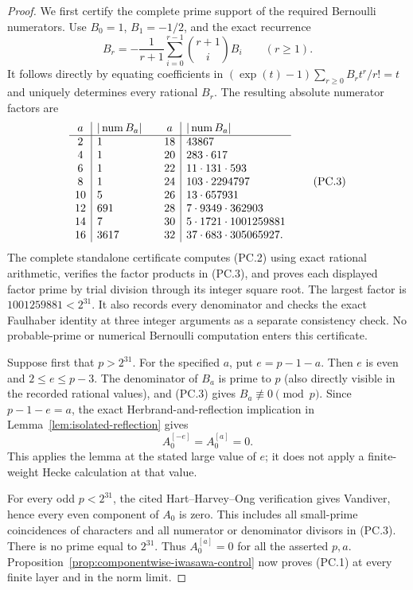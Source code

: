 \begin{proof}
We first certify the complete prime support of the required Bernoulli
numerators. Use $B_0=1$, $B_1=-1/2$, and the exact recurrence
\[
 B_r=-\frac1{r+1}\sum_{i=0}^{r-1}\binom{r+1}{i}B_i
                         \qquad(r\geq1).
 \tag{PC.2}
\]
It follows directly by equating coefficients in
$(\exp(t)-1)\sum_{r\geq0}B_rt^r/r!=t$ and uniquely determines
every rational $B_r$. The resulting absolute numerator factors are
\[
\begin{array}{c|l@{\qquad}c|l}
a&|\operatorname{num}B_a|&a&|\operatorname{num}B_a|\\ \hline
2&1&18&43867\\
4&1&20&283\cdot617\\
6&1&22&11\cdot131\cdot593\\
8&1&24&103\cdot2294797\\
10&5&26&13\cdot657931\\
12&691&28&7\cdot9349\cdot362903\\
14&7&30&5\cdot1721\cdot1001259881\\
16&3617&32&37\cdot683\cdot305065927.
\end{array}
 \tag{PC.3}
\]
The complete standalone certificate
computes (PC.2) using exact rational arithmetic, verifies the
factor products in (PC.3), and proves each displayed factor
prime by trial division through its integer square root.
The largest factor is $1001259881<2^{31}$. It also records every
denominator and checks the exact Faulhaber identity at three
integer arguments as a separate consistency check. No probable-prime
or numerical Bernoulli computation enters this certificate.

Suppose first that $p>2^{31}$. For the specified $a$, put
$e=p-1-a$. Then $e$ is even and $2\leq e\leq p-3$.
The denominator of $B_a$ is prime to $p$ (also directly visible
in the recorded rational values), and (PC.3) gives
$B_a\not\equiv0\pmod p$. Since $p-1-e=a$, the exact
Herbrand-and-reflection implication in
Lemma~\ref{lem:isolated-reflection} gives
\[
                         A_0^{[-e]}=A_0^{[a]}=0.
\]
This applies the lemma at the stated large value of $e$;
it does not apply a finite-weight Hecke calculation at that value.

For every odd $p<2^{31}$, the cited Hart--Harvey--Ong
verification gives Vandiver, hence every even component of
$A_0$ is zero. This includes all small-prime coincidences of
characters and all numerator or denominator divisors in (PC.3).
There is no prime equal to $2^{31}$. Thus $A_0^{[a]}=0$ for
all the asserted $p,a$. Proposition~\ref{prop:componentwise-iwasawa-control}
now proves (PC.1) at every finite layer and in the norm limit.


\end{proof}
